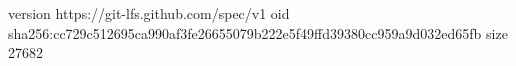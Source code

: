 version https://git-lfs.github.com/spec/v1
oid sha256:cc729c512695ca990af3fe26655079b222e5f49ffd39380cc959a9d032ed65fb
size 27682
